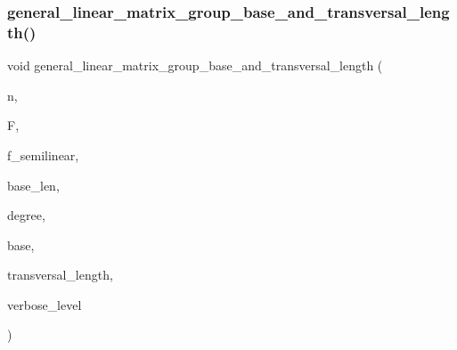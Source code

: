 \mbox{\label{group__generators_8_c_a7a47638d706bd9f4e88f50fa042da7bb}} 
\subsubsection{\texorpdfstring{general\+\_\+linear\+\_\+matrix\+\_\+group\+\_\+base\+\_\+and\+\_\+transversal\+\_\+length()}{general\_linear\_matrix\_group\_base\_and\_transversal\_length()}}
{\footnotesize\ttfamily void general\+\_\+linear\+\_\+matrix\+\_\+group\+\_\+base\+\_\+and\+\_\+transversal\+\_\+length (\begin{DoxyParamCaption}\item[{\mbox{\hyperlink{galois_8h_a09fddde158a3a20bd2dcadb609de11dc}{I\+NT}}}]{n,  }\item[{\mbox{\hyperlink{classfinite__field}{finite\+\_\+field}} $\ast$}]{F,  }\item[{\mbox{\hyperlink{galois_8h_a09fddde158a3a20bd2dcadb609de11dc}{I\+NT}}}]{f\+\_\+semilinear,  }\item[{\mbox{\hyperlink{galois_8h_a09fddde158a3a20bd2dcadb609de11dc}{I\+NT}}}]{base\+\_\+len,  }\item[{\mbox{\hyperlink{galois_8h_a09fddde158a3a20bd2dcadb609de11dc}{I\+NT}}}]{degree,  }\item[{\mbox{\hyperlink{galois_8h_a09fddde158a3a20bd2dcadb609de11dc}{I\+NT}} $\ast$}]{base,  }\item[{\mbox{\hyperlink{galois_8h_a09fddde158a3a20bd2dcadb609de11dc}{I\+NT}} $\ast$}]{transversal\+\_\+length,  }\item[{\mbox{\hyperlink{galois_8h_a09fddde158a3a20bd2dcadb609de11dc}{I\+NT}}}]{verbose\+\_\+level }\end{DoxyParamCaption})}

\mbox{\label{group__generators_8_c_ab41d403d6c8fc3ec20069d44189a5cce}} 
